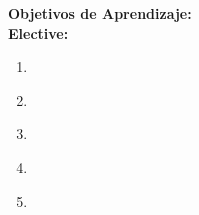 \noindent \textbf{Objetivos de Aprendizaje:}\\
\noindent \textbf{Elective:}
\begin{enumerate}
	\setcounter{enumi}{0}
	\item \ALAdvancedComputationalComplexityLODefineThe\xspace[\ALAdvancedComputationalComplexityLODefineTheLevel]\label{sec:BOK:ALAdvancedComputationalComplexityLODefineThe}
	\item \ALAdvancedComputationalComplexityLODefineTheClass\xspace[\ALAdvancedComputationalComplexityLODefineTheClassLevel]\label{sec:BOK:ALAdvancedComputationalComplexityLODefineTheClass}
	\item \ALAdvancedComputationalComplexityLOExplainTheNpAppears\xspace[\ALAdvancedComputationalComplexityLOExplainTheNpAppearsLevel]\label{sec:BOK:ALAdvancedComputationalComplexityLOExplainTheNpAppears}
	\item \ALAdvancedComputationalComplexityLOProvide\xspace[\ALAdvancedComputationalComplexityLOProvideLevel]\label{sec:BOK:ALAdvancedComputationalComplexityLOProvide}
	\item \ALAdvancedComputationalComplexityLOProve\xspace[\ALAdvancedComputationalComplexityLOProveLevel]\label{sec:BOK:ALAdvancedComputationalComplexityLOProve}
\end{enumerate}


